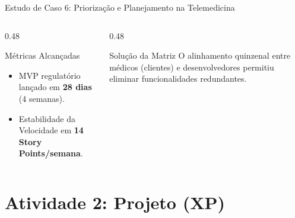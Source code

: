 \documentclass[aspectratio=169, 9pt]{beamer}
\begin{document}
\begin{frame}{Estudo de Caso 6: Priorização e Planejamento na Telemedicina}
  \vspace{-0.1cm}

  \begin{columns}[T]
    \begin{column}{0.48\textwidth}
      \begin{exampleblock}{Métricas Alcançadas}
        \begin{itemize}
          \item MVP regulatório lançado em \textbf{28 dias} (4 semanas).
          \item Estabilidade da Velocidade em \textbf{14 Story Points/semana}.
        \end{itemize}
      \end{exampleblock}
    \end{column}

    \begin{column}{0.48\textwidth}
      \begin{alertblock}{Solução da Matriz}
        O alinhamento quinzenal entre médicos (clientes) e desenvolvedores permitiu eliminar funcionalidades redundantes.
      \end{alertblock}
    \end{column}
  \end{columns}
\end{frame}

\section{Atividade 2: Projeto (XP)}
\end{document}
